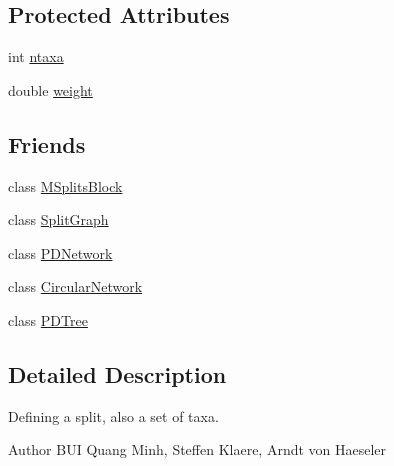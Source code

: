 \subsection*{Protected Attributes}
\begin{DoxyCompactItemize}
\item 
int \hyperlink{classSplit_a41a18ab8832241bb319a4ddbca3af8b5}{ntaxa}
\item 
double \hyperlink{classSplit_aa8845f08e5d041e68ed0475fca6954c5}{weight}
\end{DoxyCompactItemize}
\subsection*{Friends}
\begin{DoxyCompactItemize}
\item 
\hypertarget{classSplit_ad180a9052e2cfb059a0ea9d7b370ec7b}{
class \hyperlink{classSplit_ad180a9052e2cfb059a0ea9d7b370ec7b}{MSplitsBlock}}
\label{classSplit_ad180a9052e2cfb059a0ea9d7b370ec7b}

\item 
\hypertarget{classSplit_ab8ea3e9164803ba3b6b59fab949bd0f3}{
class \hyperlink{classSplit_ab8ea3e9164803ba3b6b59fab949bd0f3}{SplitGraph}}
\label{classSplit_ab8ea3e9164803ba3b6b59fab949bd0f3}

\item 
\hypertarget{classSplit_aa341ce7452c8af86ea325aa7eff2f02d}{
class \hyperlink{classSplit_aa341ce7452c8af86ea325aa7eff2f02d}{PDNetwork}}
\label{classSplit_aa341ce7452c8af86ea325aa7eff2f02d}

\item 
\hypertarget{classSplit_a1615e6a0c22088bac5824899e6c3fa6e}{
class \hyperlink{classSplit_a1615e6a0c22088bac5824899e6c3fa6e}{CircularNetwork}}
\label{classSplit_a1615e6a0c22088bac5824899e6c3fa6e}

\item 
\hypertarget{classSplit_a5ea42f356770ae950d06d0e4917f93ad}{
class \hyperlink{classSplit_a5ea42f356770ae950d06d0e4917f93ad}{PDTree}}
\label{classSplit_a5ea42f356770ae950d06d0e4917f93ad}

\end{DoxyCompactItemize}


\subsection{Detailed Description}
Defining a split, also a set of taxa.

\begin{DoxyAuthor}{Author}
BUI Quang Minh, Steffen Klaere, Arndt von Haeseler 
\end{DoxyAuthor}


